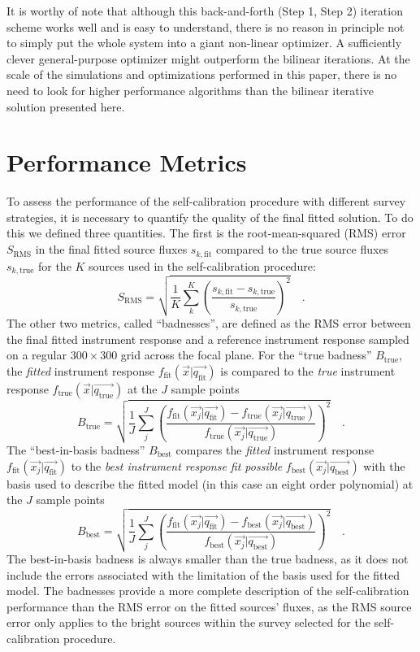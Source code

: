 \documentclass[preprint,pdftex]{aastex}
\newcommand{\true}{\text{true}}
\newcommand{\fit}{\text{fit}}
\newcommand{\basis}{\text{best}}
\begin{document}
It is worthy of note that although this back-and-forth (Step 1, Step
2) iteration scheme works well and is easy to understand, there is no
reason in principle not to simply put the whole system into a giant
non-linear optimizer.  A sufficiently clever general-purpose optimizer
might outperform the bilinear iterations.  At the scale of the
simulations and optimizations performed in this paper, there is no
need to look for higher performance algorithms than the bilinear
iterative solution presented here.

\section{Performance Metrics}
\label{sec:metrics}
To assess the performance of the self-calibration procedure with different survey strategies, it is necessary to quantify the quality of the final fitted solution. To do this we defined three quantities. The first is the root-mean-squared (RMS) error $S_\text{RMS}$ in the final fitted source fluxes $s_{k,\fit}$ compared to the true source fluxes $s_{k,\true}$ for the $K$ sources used in the self-calibration procedure:
\begin{equation}
S_\text{RMS} = \sqrt{\dfrac{1}{K} \sum_k^K \left( \dfrac{s_{k,\fit} - s_{k,\true}}{s_{k,\true}} \right)^2}   \quad .
\end{equation}
The other two metrics, called ``badnesses'', are defined as the RMS error between the final fitted instrument response and a reference instrument response sampled on a regular $300 \times 300$ grid across the focal plane. For the ``true badness'' $B_\true$, the \textit{fitted} instrument response $f_\fit(\vec{x} | \vec{q_\fit})$ is compared to the \textit{true} instrument response $f_\true(\vec{x} | \vec{q_\true})$ at the $J$ sample points  
\begin{equation}
B_\true = \sqrt{\dfrac{1}{J} \sum_j^J \left(\dfrac{f_\fit(\vec{x_j} | \vec{q_\fit}) - f_\true(\vec{x_j} | \vec{q_\true})}{f_\true(\vec{x_j} | \vec{q_\true})}\right)^2}   \quad .
\end{equation}
The ``best-in-basis badness'' $B_\basis$ compares the \textit{fitted} instrument response $f_\fit(\vec{x_j} | \vec{q_\fit})$ to the \textit{best instrument response fit possible} $f_\basis(\vec{x_j} | \vec{q_\basis})$ with the basis used to describe the fitted model (in this case an eight order polynomial) at the $J$ sample points
\begin{equation}
B_\basis = \sqrt{\dfrac{1}{J} \sum_j^J \left( \dfrac{f_\fit(\vec{x_j} | \vec{q_\fit}) - f_\basis(\vec{x_j} | \vec{q_\basis})}{f_\basis(\vec{x_j} | \vec{q_\basis})} \right)^2}   \quad .
\end{equation}
The best-in-basis badness is always smaller than the true badness, as it does not include the errors associated with the limitation of the basis used for the fitted model. The badnesses provide a more complete description of the self-calibration performance than the RMS error on the fitted sources' fluxes, as the RMS source error only applies to the bright sources within the survey selected for the self-calibration procedure.
\end{document}
